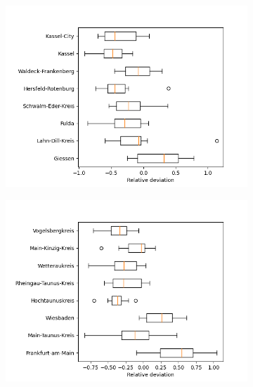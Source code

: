 \begin{figure}[h]
	\centering
	\begin{subfigure}[b]{0.4\textwidth}
		\centering
		\includegraphics[width=\textwidth]{./figures/50d/deviation_box50_1.png}	
	\end{subfigure}
	\begin{subfigure}[b]{0.4\textwidth}
		\centering
		\includegraphics[width=\textwidth]{./figures/50d/deviation_box50_2.png}	
	\end{subfigure}
	\begin{subfigure}[b]{0.4\textwidth}
		\centering

\end{subfigure}
\end{figure}
